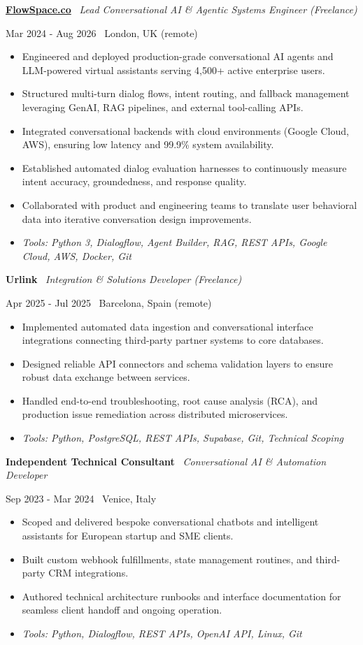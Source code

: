 \documentclass[a4paper,10pt]{article}
\newcommand{\role}[4]{%
  \vspace{2pt}\noindent
  \begin{minipage}[t]{0.70\textwidth}\raggedright\textbf{#1} \textbullet\ \textit{#3}\end{minipage}%
  \hfill
  \begin{minipage}[t]{0.28\textwidth}\raggedleft\footnotesize\color{gray}#2 \textbullet\ #4\end{minipage}%
  \vspace{1pt}%
}
\begin{document}
\role{\href{https://flowspace.co}{FlowSpace.co}}{Mar 2024 - Aug 2026}{Lead Conversational AI \& Agentic Systems Engineer (Freelance)}{London, UK (remote)}
\begin{itemize}
  \item Engineered and deployed production-grade conversational AI agents and LLM-powered virtual assistants serving 4,500+ active enterprise users.
  \item Structured multi-turn dialog flows, intent routing, and fallback management leveraging GenAI, RAG pipelines, and external tool-calling APIs.
  \item Integrated conversational backends with cloud environments (Google Cloud, AWS), ensuring low latency and 99.9\% system availability.
  \item Established automated dialog evaluation harnesses to continuously measure intent accuracy, groundedness, and response quality.
  \item Collaborated with product and engineering teams to translate user behavioral data into iterative conversation design improvements.
  \item \textit{Tools: Python 3, Dialogflow, Agent Builder, RAG, REST APIs, Google Cloud, AWS, Docker, Git}
\end{itemize}

\role{Urlink}{Apr 2025 - Jul 2025}{Integration \& Solutions Developer (Freelance)}{Barcelona, Spain (remote)}
\begin{itemize}
  \item Implemented automated data ingestion and conversational interface integrations connecting third-party partner systems to core databases.
  \item Designed reliable API connectors and schema validation layers to ensure robust data exchange between services.
  \item Handled end-to-end troubleshooting, root cause analysis (RCA), and production issue remediation across distributed microservices.
  \item \textit{Tools: Python, PostgreSQL, REST APIs, Supabase, Git, Technical Scoping}
\end{itemize}

\role{Independent Technical Consultant}{Sep 2023 - Mar 2024}{Conversational AI \& Automation Developer}{Venice, Italy}
\begin{itemize}
  \item Scoped and delivered bespoke conversational chatbots and intelligent assistants for European startup and SME clients.
  \item Built custom webhook fulfillments, state management routines, and third-party CRM integrations.
  \item Authored technical architecture runbooks and interface documentation for seamless client handoff and ongoing operation.
  \item \textit{Tools: Python, Dialogflow, REST APIs, OpenAI API, Linux, Git}
\end{itemize}
\end{document}
